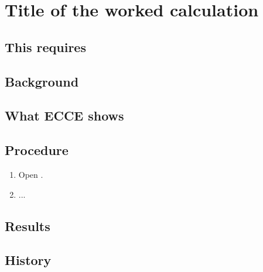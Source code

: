 \chapter{Title of the worked calculation}
\label{ch:name}


\section*{This requires}

\section{Background}

\section{What ECCE shows}

\section{Procedure}
\begin{enumerate}
	\item Open .
	\item ...
\end{enumerate}

\section{Results}


\section{History}
